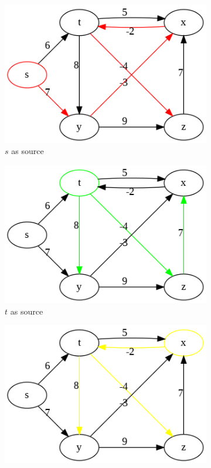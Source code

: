 \documentclass[../main.tex]{subfiles}
\begin{document}
\begin{figure}[!ht]
    \centering
    \begin{subfigure}{.32\textwidth}
    \includegraphics[width=0.99\columnwidth]{fig/shortest_path_trees_0.png}
    \caption{$s$ as source}
    \end{subfigure}
    \begin{subfigure}{.32\textwidth}
    \includegraphics[width=0.99\columnwidth]{fig/shortest_path_trees_1.png}
    \caption{$t$ as source}
    \end{subfigure}
    \begin{subfigure}{.32\textwidth}
    \includegraphics[width=0.99\columnwidth]{fig/shortest_path_trees_2.png}

\end{subfigure}
\end{figure}
\end{document}
